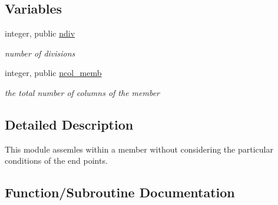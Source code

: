 \subsection*{Variables}
\begin{DoxyCompactItemize}
\item 
integer, public \hyperlink{namespacemember_a3e6a3b0896edb5c30c113dc22ab7181a}{ndiv}
\begin{DoxyCompactList}\small\item\em number of divisions \end{DoxyCompactList}\item 
integer, public \hyperlink{namespacemember_a20895477b227a3352a4e758b21b01bf8}{ncol\+\_\+memb}
\begin{DoxyCompactList}\small\item\em the total number of columns of the member \end{DoxyCompactList}\end{DoxyCompactItemize}


\subsection{Detailed Description}
This module assemles within a member without considering the particular conditions of the end points. 

\subsection{Function/\+Subroutine Documentation}
\mbox{\label{namespacemember_ad1206aacf86963bb366e5976c4f605c2}} 
